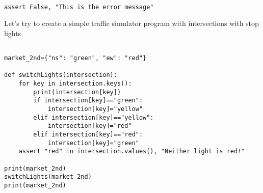 \documentclass[11pt]{article}
\begin{document}
\begin{verbatim}

assert False, "This is the error message"

\end{verbatim}

Let's try to create a simple traffic simulator program with intersections with stop lights.

\begin{verbatim}

market_2nd={"ns": "green", "ew": "red"}

def switchLights(intersection):
    for key in intersection.keys():
        print(intersection[key])
        if intersection[key]=="green":
            intersection[key]="yellow"
        elif intersection[key]=="yellow":
            intersection[key]="red"
        elif intersection[key]=="red":
            intersection[key]="green"
    assert "red" in intersection.values(), "Neither light is red!"

print(market_2nd)
switchLights(market_2nd)
print(market_2nd)

\end{verbatim}
\end{document}
